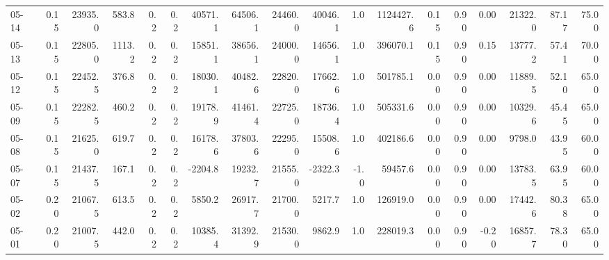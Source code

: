 \begin{threeparttable}
{\begin{tabular}{lrrrrrrrrrrrrrrrrr}
  05-14 &     0.15 & 23935.0 &             583.8 &               0.2 &                0.2 &            40571.1 & 64506.1 & 24460.0 &    40046.1 &                      1.0 &           1124427.6 &       0.15 &      0.90 &           0.00 &          21322.0 &           87.17 &                  75.00 \\
  05-13 &     0.15 & 22805.0 &            1113.2 &               0.2 &                0.2 &            15851.1 & 38656.1 & 24000.0 &    14656.1 &                      1.0 &            396070.1 &       0.15 &      0.90 &           0.15 &          13777.2 &           57.41 &                  70.00 \\
  05-12 &     0.15 & 22452.5 &             376.8 &               0.2 &                0.2 &            18030.1 & 40482.6 & 22820.0 &    17662.6 &                      1.0 &            501785.1 &       0.00 &      0.90 &           0.00 &          11889.5 &           52.10 &                  65.00 \\
  05-09 &     0.15 & 22282.5 &             460.2 &               0.2 &                0.2 &            19178.9 & 41461.4 & 22725.0 &    18736.4 &                      1.0 &            505331.6 &       0.00 &      0.90 &           0.00 &          10329.6 &           45.45 &                  65.00 \\
  05-08 &     0.15 & 21625.0 &             619.7 &               0.2 &                0.2 &            16178.6 & 37803.6 & 22295.0 &    15508.6 &                      1.0 &            402186.6 &       0.00 &      0.90 &           0.00 &           9798.0 &           43.95 &                  60.00 \\
  05-07 &     0.15 & 21437.5 &             167.1 &               0.2 &                0.2 &            -2204.8 & 19232.7 & 21555.0 &    -2322.3 &                     -1.0 &             59457.6 &       0.00 &      0.90 &           0.00 &          13783.5 &           63.95 &                  60.00 \\
  05-02 &     0.20 & 21067.5 &             613.5 &               0.2 &                0.2 &             5850.2 & 26917.7 & 21700.0 &     5217.7 &                      1.0 &            126919.0 &       0.00 &      0.90 &           0.00 &          17442.6 &           80.38 &                  65.00 \\
  05-01 &     0.20 & 21007.5 &             442.0 &               0.2 &                0.2 &            10385.4 & 31392.9 & 21530.0 &     9862.9 &                      1.0 &            228019.3 &       0.00 &      0.90 &          -0.20 &          16857.7 &           78.30 &                  65.00 \\

\end{tabular}}
\end{threeparttable}

